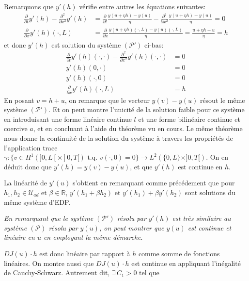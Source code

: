 \documentclass[
	french,
	11pt, %
]{fphw}
\begin{document}
Remarquons que $y'(h)$ vérifie entre autres les équations suivantes: 
\begin{align*}
	\frac{\partial}{\partial t}y'(h) - \frac{\partial^2}{\partial x^2}y'(h) &= \frac{\partial}{\partial t} \frac{y(u+\eta h)- y(u)}{\eta} - \frac{\partial^2}{\partial x^2} \frac{y(u+\eta h)-y(u)}{\eta} = 0 \\
	\frac{\partial}{\partial x}y'(h)(\cdot,L) &= \frac{\partial}{\partial x} \frac{y(u+\eta h)(\cdot,L)-y(u)(\cdot,L)}{\eta} = \frac{u+\eta h- u}{\eta} = h
\end{align*} 
et donc $y'(h)$ est solution du système $(\mathcal{P}')$ ci-bas:
\begin{align*}
	\frac{\partial}{\partial t}y'(h)(\cdot,\cdot) - \frac{\partial^2}{\partial x^2}y'(h)(\cdot,\cdot) &= 0 \\
	y'(h)(0,\cdot) &= 0 \\
	y'(h)(\cdot,0) &= 0  \\
	\frac{\partial}{\partial x}y'(h)(\cdot,L) & = h
\end{align*} 
En posant $v = h+u$, on remarque que le vecteur $y(v)-y(u)$ résout le même système $(\mathcal{P}')$. Et on peut montre l'unicité de la solution faible pour ce système en introduisant une forme linéaire continue $l$ et une forme bilinéaire continue et coercive $a$, et en concluant à l'aide du théorème vu en cours. Le même théorème nous donne la continuité de la solution du système à travers les propriétés de l'application trace $ \gamma: \{v \in H^1(]0,L[\times]0,T[) \text{ t.q. } v(\cdot,0)=0\} \rightarrow L^2(\{0,L\}\times]0,T[)$. On en déduit donc que $y'(h) = y(v)-y(u)$, et que $y'(h)$ est continue en $h$. 

La linéarité de $y'(u)$ s'obtient en remarquant comme précédement que pour $h_1, h_2 \in \mathcal{U}_{ad}$ et $\beta \in \mathbb{R}$, $y'(h_1 + \beta h_2)$ et $y'(h_1) + \beta y'(h_2)$ sont solutions du même système d'EDP. 

\textit{En remarquant que le système $(\mathcal{P}')$ résolu par $y'(h)$ est très similaire au système $(\mathcal{P})$ résolu par $y(u)$, on peut montrer que $y(u)$ est continue et linéaire en $u$ en employant la même démarche}.  

$DJ(u)\cdot h$ est donc linéaire par rapport à $h$ comme somme de fonctions linéaires. On montre aussi que $DJ(u)\cdot h$ est continue en appliquant l'inégalité de Cauchy-Schwarz. Autrement dit, $\exists \, C_1 >0$ tel que
\end{document}
